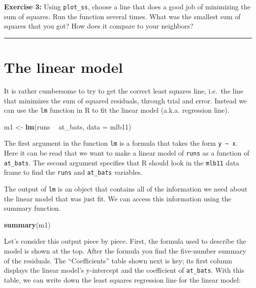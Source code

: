 \documentclass[]{book}
\newenvironment{Shaded}{\begin{snugshade}}{\end{snugshade}}
\newcommand{\KeywordTok}[1]{\textcolor[rgb]{0.13,0.29,0.53}{\textbf{#1}}}
\newcommand{\DataTypeTok}[1]{\textcolor[rgb]{0.13,0.29,0.53}{#1}}
\newcommand{\StringTok}[1]{\textcolor[rgb]{0.31,0.60,0.02}{#1}}
\newcommand{\OperatorTok}[1]{\textcolor[rgb]{0.81,0.36,0.00}{\textbf{#1}}}
\newcommand{\NormalTok}[1]{#1}
\theoremstyle{definition}
\theoremstyle{definition}
\theoremstyle{definition}
\theoremstyle{remark}
\begin{document}
\textbf{Exercise 3:} Using \texttt{plot\_ss}, choose a line that does a
good job of minimizing the sum of squares. Run the function several
times. What was the smallest sum of squares that you got? How does it
compare to your neighbors?

\begin{center}\rule{0.5\linewidth}{\linethickness}\end{center}

\section{The linear model}\label{the-linear-model}

It is rather cumbersome to try to get the correct least squares line,
i.e.~the line that minimizes the sum of squared residuals, through trial
and error. Instead we can use the \texttt{lm} function in R to fit the
linear model (a.k.a. regression line).

\begin{Shaded}
\begin{Highlighting}[]
\NormalTok{m1 <-}\StringTok{ }\KeywordTok{lm}\NormalTok{(runs }\OperatorTok{~}\StringTok{ }\NormalTok{at_bats, }\DataTypeTok{data =}\NormalTok{ mlb11)}
\end{Highlighting}
\end{Shaded}

The first argument in the function \texttt{lm} is a formula that takes
the form \texttt{y\ \textasciitilde{}\ x}. Here it can be read that we
want to make a linear model of \texttt{runs} as a function of
\texttt{at\_bats}. The second argument specifies that R should look in
the \texttt{mlb11} data frame to find the \texttt{runs} and
\texttt{at\_bats} variables.

The output of \texttt{lm} is an object that contains all of the
information we need about the linear model that was just fit. We can
access this information using the summary function.

\begin{Shaded}
\begin{Highlighting}[]
\KeywordTok{summary}\NormalTok{(m1)}
\end{Highlighting}
\end{Shaded}

Let's consider this output piece by piece. First, the formula used to
describe the model is shown at the top. After the formula you find the
five-number summary of the residuals. The ``Coefficients'' table shown
next is key; its first column displays the linear model's y-intercept
and the coefficient of \texttt{at\_bats}. With this table, we can write
down the least squares regression line for the linear model:
\end{document}

